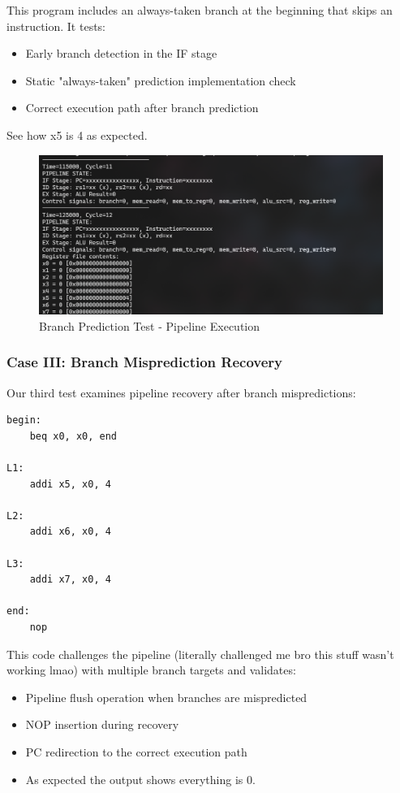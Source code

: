 \documentclass{article}
\numberwithin{figure}{section}
\numberwithin{table}{section}
\begin{document}
This program includes an always-taken branch at the beginning that skips an instruction. It tests:
\begin{itemize}
    \item Early branch detection in the IF stage
    \item Static "always-taken" prediction implementation check
    \item Correct execution path after branch prediction
\end{itemize}
See how x5 is 4 as expected.

\begin{figure}[H]
    \centering
    \includegraphics[width=0.95\linewidth]{pipe_test3.png}
    \caption{Branch Prediction Test - Pipeline Execution}
    \label{fig:pipe-test3}
\end{figure}

\subsubsection{Case III: Branch Misprediction Recovery}

Our third test examines pipeline recovery after branch mispredictions:

\begin{lstlisting}[style=verilog-style]
begin:
    beq x0, x0, end

L1:
    addi x5, x0, 4

L2:
    addi x6, x0, 4

L3:
    addi x7, x0, 4

end:
    nop
\end{lstlisting}

This code challenges the pipeline (literally challenged me bro this stuff wasn't working lmao) with multiple branch targets and validates:
\begin{itemize}
    \item Pipeline flush operation when branches are mispredicted
    \item NOP insertion during recovery
    \item PC redirection to the correct execution path
    \item As expected the output shows everything is 0.
\end{itemize}
\end{document}
